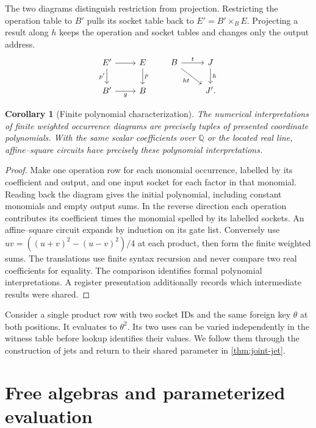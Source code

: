 \documentclass[11pt,a4paper]{article}
\newtheorem{corollary}[corollary]{Corollary}
\theoremstyle{definition}
\theoremstyle{remark}\newaliascnt{remark}{theorem}
\newcommand{\Q}{\mathbb Q}
\numberwithin{equation}{section}
\begin{document}
The two diagrams distinguish restriction from projection. Restricting the operation table to $B'$ pulls its socket table back to $E'=B'\times_B E$. Projecting a result along $h$ keeps the operation and socket tables and changes only the output address.
\[
\begin{tikzcd}
 E'\arrow[r]\arrow[d,"p'"']&E\arrow[d,"p"]\\
 B'\arrow[r,"g"']&B
\end{tikzcd}
\qquad
\begin{tikzcd}
 B\arrow[r,"t"]\arrow[dr,"ht"']&J\arrow[d,"h"]\\
 &J'.
\end{tikzcd}
\]
\begin{corollary}[Finite polynomial characterization]\label{thm:polycl}
The numerical interpretations of finite weighted occurrence diagrams are precisely tuples of presented coordinate polynomials. With the same scalar coefficients over $\Q$ or the located real line, affine--square circuits have precisely these polynomial interpretations.
\end{corollary}
\begin{proof}
Make one operation row for each monomial occurrence, labelled by its coefficient and output, and one input socket for each factor in that monomial. Reading back the diagram gives the initial polynomial, including constant monomials and empty output sums. In the reverse direction each operation contributes its coefficient times the monomial spelled by its labelled sockets. An affine--square circuit expands by induction on its gate list. Conversely use $uv=((u+v)^2-(u-v)^2)/4$ at each product, then form the finite weighted sums. The translations use finite syntax recursion and never compare two real coefficients for equality. The comparison identifies formal polynomial interpretations. A register presentation additionally records which intermediate results were shared.
\end{proof}

Consider a single product row with two socket IDs and the same foreign key $\theta$ at both positions. It evaluates to $\theta^2$. Its two uses can be varied independently in the witness table before lookup identifies their values. We follow them through the construction of jets and return to their shared parameter in \cref{thm:joint-jet}.

\section{Free algebras and parameterized evaluation}\label{sec:para}
\end{document}
